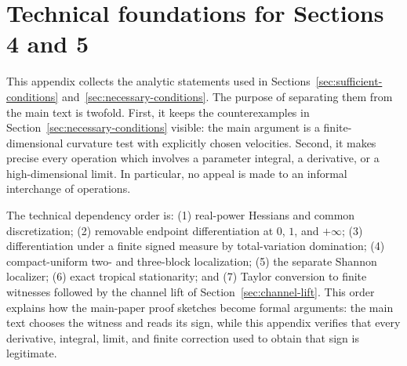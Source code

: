 \documentclass[aps,pra,11pt,onecolumn,nofootinbib,tightenlines]{revtex4-2}
\theoremstyle{definition}
\begin{document}
\clearpage
\appendix
\section{Technical foundations for Sections 4 and 5}
\label{app:technical-sections45}

This appendix collects the analytic statements used in Sections~\ref{sec:sufficient-conditions} and~\ref{sec:necessary-conditions}.  The purpose of separating them from the main text is twofold.  First, it keeps the counterexamples in Section~\ref{sec:necessary-conditions} visible: the main argument is a finite-dimensional curvature test with explicitly chosen velocities.  Second, it makes precise every operation which involves a parameter integral, a derivative, or a high-dimensional limit.  In particular, no appeal is made to an informal interchange of operations.

The technical dependency order is: (1) real-power Hessians and common
discretization; (2) removable endpoint differentiation at $0$, $1$, and
$+\infty$; (3) differentiation under a finite signed measure by total-variation
domination; (4) compact-uniform two- and three-block localization; (5) the
separate Shannon localizer; (6) exact tropical stationarity; and (7) Taylor
conversion to finite witnesses followed by the channel lift of
Section~\ref{sec:channel-lift}.  This order explains how the main-paper proof sketches
become formal arguments: the main text chooses the witness and reads its sign,
while this appendix verifies that every derivative, integral, limit, and finite
correction used to obtain that sign is legitimate.
\end{document}
